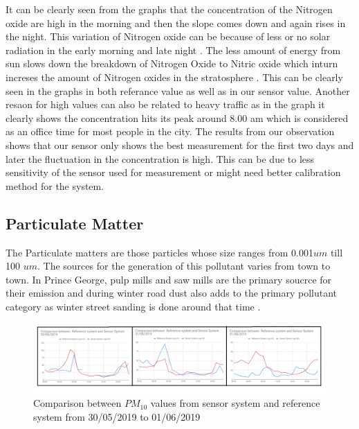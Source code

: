     It can be clearly seen from the graphs that the concentration of the Nitrogen oxide are high in the morning and then the slope comes down and again rises in the night. This variation of Nitrogen oxide can be because of less or no  solar radiation in the early morning and late night \cite{Environment2010} \cite{George2005}. The less amount of energy from sun slows down the breakdown of Nitrogen Oxide to Nitric oxide which inturn increses the amount of Nitrogen oxides in the stratosphere \cite{EnvironmentalQualitySectionMoE2012} \cite{Environment2010}. This can be clearly seen in the graphs in both referance value as well as in our sensor value. Another resaon for high values can also be related to heavy traffic as in the graph it clearly shows the concentration hits its peak around 8.00 am which is considered as an office time for most people in the city. The results from our observation shows that our sensor only shows the best measurement for the first two days and later the fluctuation in the concentration is high. This can be due to less sensitivity of the sensor used for measurement or might need better calibration method for the system.



\subsection{Particulate Matter}

The Particulate matters are those particles whose size ranges from 0.001$um$ till 100 $um$. The sources for the generation of this pollutant varies from town to town. In Prince George, pulp mills and saw mills are the primary soucrce for their emission and during winter road dust also adds to the primary pollutant category as winter street sanding is done around that time \cite{Champagne1996}.


    \begin{figure}[h]
      \begin{center}
      \includegraphics[scale=0.70]{images/figure25.png}
      \end{center}
      \caption{Comparison between $PM_{10}$ values from sensor system and reference system from 30/05/2019 to 01/06/2019}
    \label{PM10}
  \end{figure}

